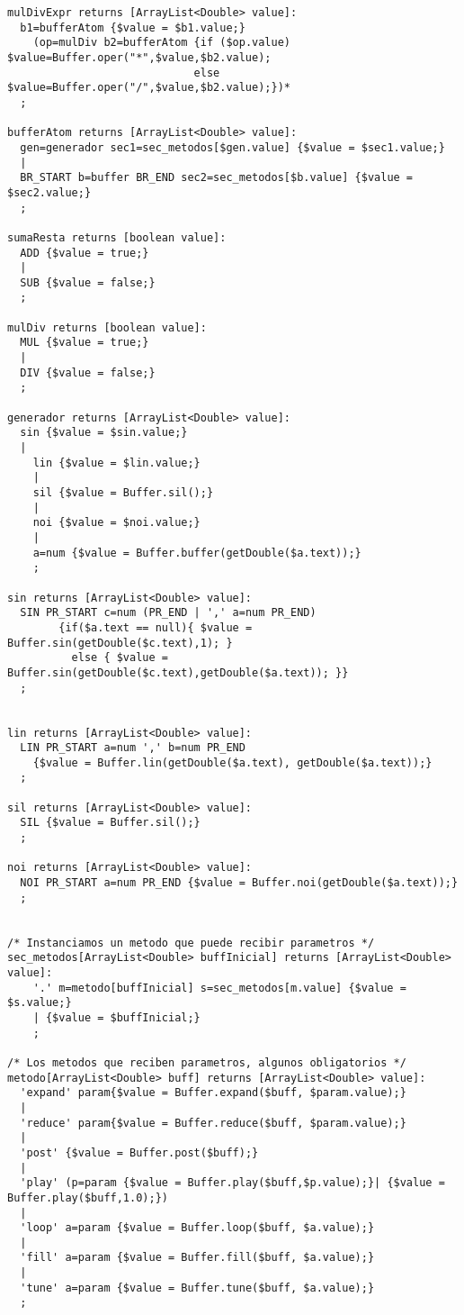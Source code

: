 \documentclass[a4paper]{article}
\begin{document}
\begin{lstlisting}[style=MyLang]
mulDivExpr returns [ArrayList<Double> value]:
  b1=bufferAtom {$value = $b1.value;} 
    (op=mulDiv b2=bufferAtom {if ($op.value) $value=Buffer.oper("*",$value,$b2.value); 
                             else $value=Buffer.oper("/",$value,$b2.value);})*
  ;
  
bufferAtom returns [ArrayList<Double> value]:
  gen=generador sec1=sec_metodos[$gen.value] {$value = $sec1.value;}
  |
  BR_START b=buffer BR_END sec2=sec_metodos[$b.value] {$value = $sec2.value;}  
  ;
  
sumaResta returns [boolean value]:
  ADD {$value = true;} 
  |
  SUB {$value = false;}
  ;
        
mulDiv returns [boolean value]:
  MUL {$value = true;} 
  |
  DIV {$value = false;} 
  ;

generador returns [ArrayList<Double> value]:
  sin {$value = $sin.value;}
  |
	lin {$value = $lin.value;}
	| 
	sil {$value = Buffer.sil();} 
	| 
	noi {$value = $noi.value;}
	|
	a=num {$value = Buffer.buffer(getDouble($a.text));}
	;
	
sin returns [ArrayList<Double> value]: 
  SIN PR_START c=num (PR_END | ',' a=num PR_END) 
        {if($a.text == null){ $value = Buffer.sin(getDouble($c.text),1); } 
          else { $value = Buffer.sin(getDouble($c.text),getDouble($a.text)); }}
  ;
  
  
lin returns [ArrayList<Double> value]:
  LIN PR_START a=num ',' b=num PR_END 
    {$value = Buffer.lin(getDouble($a.text), getDouble($a.text));}
  ;
  
sil returns [ArrayList<Double> value]: 
  SIL {$value = Buffer.sil();}
  ;
  
noi returns [ArrayList<Double> value]:
  NOI PR_START a=num PR_END {$value = Buffer.noi(getDouble($a.text));}
  ;
   
  
/* Instanciamos un metodo que puede recibir parametros */	
sec_metodos[ArrayList<Double> buffInicial] returns [ArrayList<Double> value]:	
	'.' m=metodo[buffInicial] s=sec_metodos[m.value] {$value = $s.value;}
	| {$value = $buffInicial;}
	;

/* Los metodos que reciben parametros, algunos obligatorios */
metodo[ArrayList<Double> buff] returns [ArrayList<Double> value]:	
  'expand' param{$value = Buffer.expand($buff, $param.value);}
  | 
  'reduce' param{$value = Buffer.reduce($buff, $param.value);}
  | 
  'post' {$value = Buffer.post($buff);}
  | 
  'play' (p=param {$value = Buffer.play($buff,$p.value);}| {$value = Buffer.play($buff,1.0);})
  | 
  'loop' a=param {$value = Buffer.loop($buff, $a.value);}
  | 
  'fill' a=param {$value = Buffer.fill($buff, $a.value);}
  | 
  'tune' a=param {$value = Buffer.tune($buff, $a.value);}
  ;


\end{lstlisting}
\end{document}
